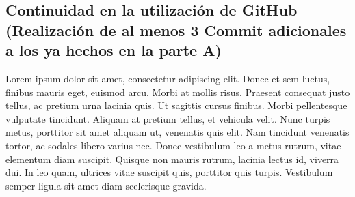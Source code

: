 \subsection{Continuidad en la utilización de GitHub (Realización de al menos 3 Commit adicionales a los ya hechos en la parte A)}

Lorem ipsum dolor sit amet, consectetur adipiscing elit. Donec et sem luctus, finibus mauris eget, euismod arcu. Morbi at mollis risus. Praesent consequat justo tellus, ac pretium urna lacinia quis. Ut sagittis cursus finibus. Morbi pellentesque vulputate tincidunt. Aliquam at pretium tellus, et vehicula velit. Nunc turpis metus, porttitor sit amet aliquam ut, venenatis quis elit. Nam tincidunt venenatis tortor, ac sodales libero varius nec. Donec vestibulum leo a metus rutrum, vitae elementum diam suscipit. Quisque non mauris rutrum, lacinia lectus id, viverra dui. In leo quam, ultrices vitae suscipit quis, porttitor quis turpis. Vestibulum semper ligula sit amet diam scelerisque gravida.
